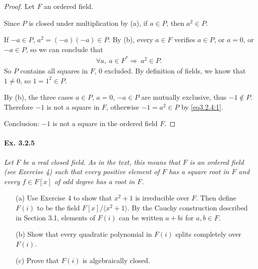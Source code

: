 \documentclass[11pt,a4paper]{article}
\begin{document}
\begin{proof}
Let $F$ an ordered field. 

Since  $P$ is closed under multiplication by (a), if $a \in P$, then $a^2 \in P$.

If $-a \in P$, $a^2 = (-a)(-a) \in P$. By (b), every $a\in F$ verifies $a\in P$, or $a=0$, or $-a\in P$, so we can conclude that 
\begin{align}
\forall  a,\  a \in F^* \Rightarrow \ a^2 \in P. \label{eq3.2.4:1}
\end{align}
So $P$ contains all squares in $F$, $0$ excluded.
By definition of fields, we know that $1\neq 0$, so $1 = 1^2 \in P$.

By (b), the three cases $a\in P$,  $a=0$, $-a\in P$ are mutually exclusive, thus $-1 \not \in P$.
Therefore  $-1$ is not a square in $F$, otherwise $-1 = a^2 \in P$ by \eqref{eq3.2.4:1}.

Conclusion: $-1$ is not a square in the ordered field $F$.
\end{proof}

\paragraph{Ex. 3.2.5}

{\it Let $F$ be a real closed field. As in the text, this means that $F$ is an ordered field (see Exercise 4) such that every positive element of $F$ has a square root in $F$ and every $f\in F[x]$ of odd degree has a root in $F$.
\begin{enumerate}
\item[(a)] Use Exercise 4 to show that $x^2 + 1$ is irreducible over $F$. Then define $F(i)$ to be the field $F[x]/\langle x^2+1\rangle$. By the Cauchy construction described in Section 3.1, elements of $F(i)$ can be written $a+bi$ for $a,b\in F$.
\item[(b)] Show that every quadratic polynomial in $F(i)$ splits completely over $F(i)$.
\item[(c)] Prove that $F(i)$ is algebraically closed.
\end{enumerate}
}
\end{document}
